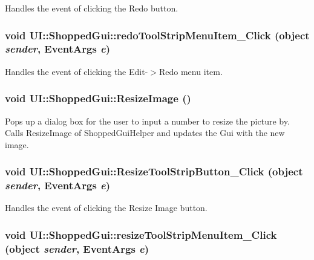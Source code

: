 \label{class_u_i_1_1_shopped_gui_a1b0a305e8263bd20d979d2d0b04c726b}
Handles the event of clicking the Redo button. \hypertarget{class_u_i_1_1_shopped_gui_a5828d5deddf5b8453e01db469a1a6f83}{
\subsubsection[{redoToolStripMenuItem\_\-Click}]{\setlength{\rightskip}{0pt plus 5cm}void UI::ShoppedGui::redoToolStripMenuItem\_\-Click (object {\em sender}, \/  EventArgs {\em e})}}
\label{class_u_i_1_1_shopped_gui_a5828d5deddf5b8453e01db469a1a6f83}
Handles the event of clicking the Edit-\/$>$Redo menu item. \hypertarget{class_u_i_1_1_shopped_gui_a17f56127994db9ab942c65baf3506172}{
\subsubsection[{ResizeImage}]{\setlength{\rightskip}{0pt plus 5cm}void UI::ShoppedGui::ResizeImage ()}}
\label{class_u_i_1_1_shopped_gui_a17f56127994db9ab942c65baf3506172}
Pops up a dialog box for the user to input a number to resize the picture by. Calls ResizeImage of ShoppedGuiHelper and updates the Gui with the new image. \hypertarget{class_u_i_1_1_shopped_gui_aa7a084a294a53c365db6ff2819c41ca4}{
\subsubsection[{ResizeToolStripButton\_\-Click}]{\setlength{\rightskip}{0pt plus 5cm}void UI::ShoppedGui::ResizeToolStripButton\_\-Click (object {\em sender}, \/  EventArgs {\em e})}}
\label{class_u_i_1_1_shopped_gui_aa7a084a294a53c365db6ff2819c41ca4}
Handles the event of clicking the Resize Image button. \hypertarget{class_u_i_1_1_shopped_gui_a05e2b57477f10f88b1ee06b6b5aa4d86}{
\subsubsection[{resizeToolStripMenuItem\_\-Click}]{\setlength{\rightskip}{0pt plus 5cm}void UI::ShoppedGui::resizeToolStripMenuItem\_\-Click (object {\em sender}, \/  EventArgs {\em e})}}
